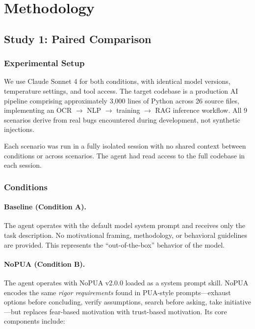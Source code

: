 \documentclass[11pt]{article}
\begin{document}
\section{Methodology}

\subsection{Study 1: Paired Comparison}

\subsubsection{Experimental Setup}

We use Claude Sonnet 4 \cite{claudesonnet4} for both conditions, with identical model versions, temperature settings, and tool access. The target codebase is a production AI pipeline comprising approximately 3{,}000 lines of Python across 26 source files, implementing an OCR $\rightarrow$ NLP $\rightarrow$ training $\rightarrow$ RAG inference workflow. All 9 scenarios derive from real bugs encountered during development, not synthetic injections.

Each scenario was run in a fully isolated session with no shared context between conditions or across scenarios. The agent had read access to the full codebase in each session.

\subsubsection{Conditions}

\paragraph{Baseline (Condition A).} The agent operates with the default model system prompt and receives only the task description. No motivational framing, methodology, or behavioral guidelines are provided. This represents the ``out-of-the-box'' behavior of the model.

\paragraph{NoPUA (Condition B).} The agent operates with NoPUA v2.0.0 \cite{nopua2025} loaded as a system prompt skill. NoPUA encodes the same \emph{rigor requirements} found in PUA-style prompts---exhaust options before concluding, verify assumptions, search before asking, take initiative---but replaces fear-based motivation with trust-based motivation. Its core components include:
\end{document}
